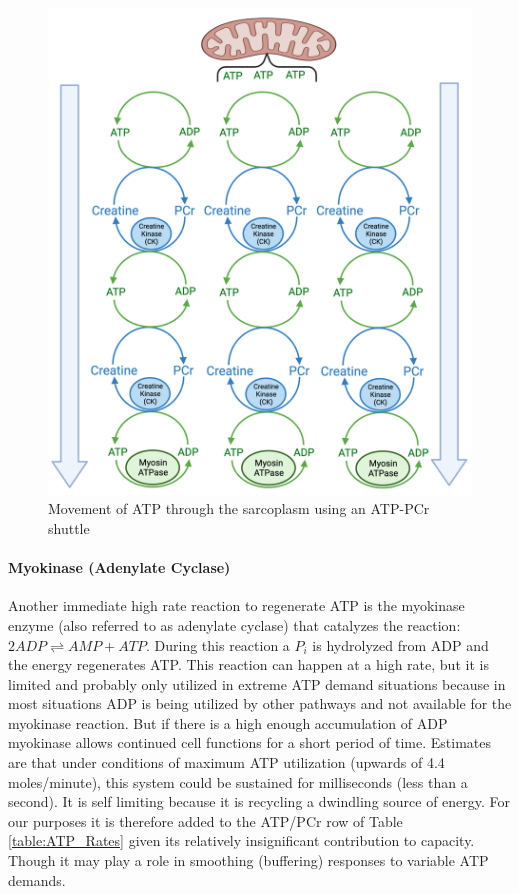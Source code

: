\begin{figure}[h!]
    \centering
    \includegraphics[width=0.75\linewidth]{./figure/PCr.png}
    \caption{Movement of ATP through the sarcoplasm using an ATP-PCr shuttle}
    \label{fig:PCr}
\end{figure}

\paragraph{Myokinase (Adenylate Cyclase)}

Another immediate high rate reaction to regenerate ATP is the myokinase enzyme (also referred to as adenylate cyclase) that catalyzes the reaction: $2ADP \rightleftharpoons AMP + ATP$. During this reaction a $P_i$ is hydrolyzed from ADP and the energy regenerates ATP. This reaction can happen at a high rate, but it is limited and probably only utilized in extreme ATP demand situations because in most situations ADP is being utilized by other pathways and not available for the myokinase reaction. But if there is a high enough accumulation of ADP myokinase allows continued cell functions for a short period of time. Estimates are that under conditions of maximum ATP utilization (upwards of 4.4 moles/minute), this system could be sustained for milliseconds (less than a second). It is self limiting because it is recycling a dwindling source of energy. For our purposes it is therefore added to the ATP/PCr row of Table \ref{table:ATP_Rates} given its relatively insignificant contribution to capacity. Though it may play a role in smoothing (buffering) responses to variable ATP demands.

